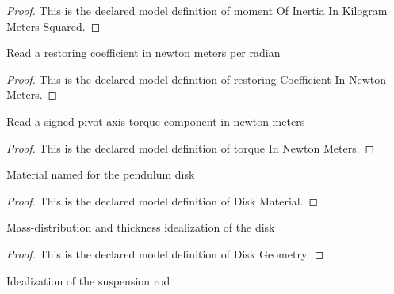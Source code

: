 \begin{proof}
  This is the declared model definition of moment Of Inertia In Kilogram Meters Squared.
\end{proof}
\begin{definition}
  \label{def:physics:phyx-mini-0276:phyxminiproblems-problemphyxmini0276-restoringcoefficientinnewtonmeters}
  Read a restoring coefficient in newton meters per radian
\end{definition}
\begin{proof}
  This is the declared model definition of restoring Coefficient In Newton Meters.
\end{proof}
\begin{definition}
  \label{def:physics:phyx-mini-0276:phyxminiproblems-problemphyxmini0276-torqueinnewtonmeters}
  Read a signed pivot-axis torque component in newton meters
\end{definition}
\begin{proof}
  This is the declared model definition of torque In Newton Meters.
\end{proof}
\begin{definition}
  \label{def:physics:phyx-mini-0276:phyxminiproblems-problemphyxmini0276-diskmaterial}
  Material named for the pendulum disk
\end{definition}
\begin{proof}
  This is the declared model definition of Disk Material.
\end{proof}
\begin{definition}
  \label{def:physics:phyx-mini-0276:phyxminiproblems-problemphyxmini0276-diskgeometry}
  Mass-distribution and thickness idealization of the disk
\end{definition}
\begin{proof}
  This is the declared model definition of Disk Geometry.
\end{proof}
\begin{definition}
  \label{def:physics:phyx-mini-0276:phyxminiproblems-problemphyxmini0276-rodidealization}
  Idealization of the suspension rod
\end{definition}
